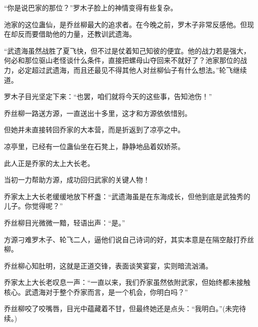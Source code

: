 \begin{this_body}
“你是说巴家的那位？”罗木子脸上的神情变得有些复杂。

池家的这位蛊仙，是乔丝柳最大的追求者。在今晚之前，罗木子非常反感他。但现在却反而要借助他的力量，还教训武遗海。

“武遗海虽然战胜了夏飞快，但不过是仗着知己知彼的便宜。他的战力若是强大，何必和那位驱山老怪谈什么条件，直接把螺母山夺回来不就好了？池家那位的战力，必定超过武遗海，而且还最见不得其他人对丝柳仙子有什么想法。”轮飞继续道。

罗木子目光坚定下来：“也罢，咱们就将今天的这些事，告知池伤！”

乔丝柳一路送方源，一直送出十多里，这才和方源依依惜别。

但她并未直接转回乔家的大本营，而是折返到了凉亭之中。

凉亭里，已经有一位蛊仙坐在石凳上，静静地品着奴娇茶。

此人正是乔家的太上大长老。

当初一力帮助方源，成功回归武家的关键人物！

乔家太上大长老缓缓地放下杯盏：“武遗海虽是在东海成长，但他到底是武独秀的儿子。你觉得呢？”

乔丝柳目光微微一黯，轻语出声：“是。”

方源刁难罗木子、轮飞二人，逼他们说自己诗词的好，其实本意是在隔空敲打乔丝柳。

乔丝柳心知肚明，这就是正道交锋，表面谈笑宴宴，实则暗流汹涌。

乔家太上大长老叹息一声：“一直以来，我们乔家虽然依附武家，但始终都未接触核心。武遗海对于整个乔家而言，是一个机会，你明白吗？”

乔丝柳咬了咬嘴唇，目光中蕴藏着不甘，但最终她还是点头：“我明白。”(未完待续。)

\end{this_body}

